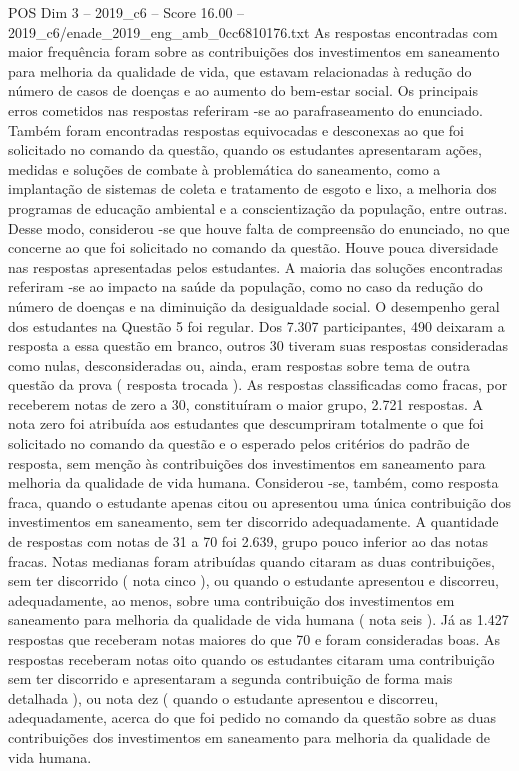 \begin{textsample}{POS Dim 3 – 2019\_c6 – Score 16.00 – 2019\_c6/enade\_2019\_eng\_amb\_0cc6810176.txt}
As respostas encontradas com maior frequência foram sobre as contribuições dos investimentos em saneamento para melhoria da qualidade de vida, que estavam relacionadas à redução do número de casos de doenças e ao aumento do bem-estar social.
Os principais erros cometidos nas respostas referiram -se ao parafraseamento do enunciado.
Também foram encontradas respostas equivocadas e desconexas ao que foi solicitado no comando da questão, quando os estudantes apresentaram ações, medidas e soluções de combate à problemática do saneamento, como a implantação de sistemas de coleta e tratamento de esgoto e lixo, a melhoria dos programas de educação ambiental e a conscientização da população, entre outras.
Desse modo, considerou -se que houve falta de compreensão do enunciado, no que concerne ao que foi solicitado no comando da questão.
Houve pouca diversidade nas respostas apresentadas pelos estudantes.
A maioria das soluções encontradas referiram -se ao impacto na saúde da população, como no caso da redução do número de doenças e na diminuição da desigualdade social.
O desempenho geral dos estudantes na Questão 5 foi regular.
Dos 7.307 participantes, 490 deixaram a resposta a essa questão em branco, outros 30 tiveram suas respostas consideradas como nulas, desconsideradas ou, ainda, eram respostas sobre tema de outra questão da prova ( resposta trocada ).
As respostas classificadas como fracas, por receberem notas de zero a 30, constituíram o maior grupo, 2.721 respostas.
A nota zero foi atribuída aos estudantes que descumpriram totalmente o que foi solicitado no comando da questão e o esperado pelos critérios do padrão de resposta, sem menção às contribuições dos investimentos em saneamento para melhoria da qualidade de vida humana.
Considerou -se, também, como resposta fraca, quando o estudante apenas citou ou apresentou uma única contribuição dos investimentos em saneamento, sem ter discorrido adequadamente.
A quantidade de respostas com notas de 31 a 70 foi 2.639, grupo pouco inferior ao das notas fracas.
Notas medianas foram atribuídas quando citaram as duas contribuições, sem ter discorrido ( nota cinco ), ou quando o estudante apresentou e discorreu, adequadamente, ao menos, sobre uma contribuição dos investimentos em saneamento para melhoria da qualidade de vida humana ( nota seis ).
Já as 1.427 respostas que receberam notas maiores do que 70 e foram consideradas boas.
As respostas receberam notas oito quando os estudantes citaram uma contribuição sem ter discorrido e apresentaram a segunda contribuição de forma mais detalhada ), ou nota dez ( quando o estudante apresentou e discorreu, adequadamente, acerca do que foi pedido no comando da questão sobre as duas contribuições dos investimentos em saneamento para melhoria da qualidade de vida humana.

\end{textsample}

